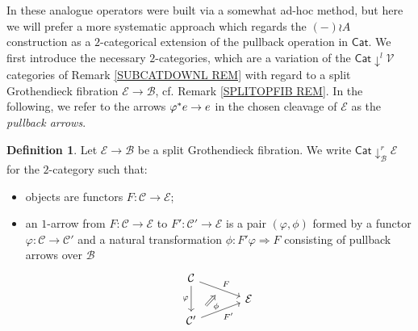 \documentclass[a4paper,10pt
,draft
]{article}%
\numberwithin{equation}{section}
\numberwithin{figure}{section}
\theoremstyle{definition} %
\newtheorem{definition}[equation]{Definition}%
\newcommand{\Cat}{\mathsf{Cat}}
\newcommand{\V}{\ensuremath{\mathcal V}}
\newcommand{\1}{\ensuremath{\mathbbm 1}}%
\begin{document}
In \cite{BP_geo} these analogue operators were built via a somewhat ad-hoc method, but here we will prefer a more systematic approach which regards the $(-) \wr A$ construction as a $2$-categorical extension of the pullback operation in $\Cat$.
We first introduce the necessary $2$-categories,
which are a variation of the 
$\mathsf{Cat}\downarrow^l \V$
categories of Remark \ref{SUBCATDOWNL REM} with regard to 
a split Grothendieck fibration $\mathcal{E} \to \mathcal{B}$,
cf. Remark \ref{SPLITOPFIB REM}.
In the following, we refer to the arrows 
$\varphi^{\**}e \to e$ in
the chosen cleavage of $\mathcal{E}$ as the \emph{pullback arrows}.





\begin{definition}
Let $\mathcal{E} \to \mathcal{B}$ be a split Grothendieck fibration.
We write $\mathsf{Cat}\downarrow^r_{\mathcal{B}} \mathcal{E}$ for the $2$-category such that:
\begin{itemize}
	\item objects are functors $F \colon \mathcal{C} \to \mathcal{E}$; 
	
	\item an $1$-arrow from 
	$F \colon \mathcal{C} \to \mathcal{E}$
	to
	$F' \colon \mathcal{C}' \to \mathcal{E}$
	is a pair $(\varphi,\phi)$
	formed by a functor $\varphi\colon \mathcal{C} \to \mathcal{C}'$ and a natural transformation $\phi \colon F' \varphi \Rightarrow F$ consisting of pullback arrows over $\mathcal{B}$
		\begin{equation}
		\begin{tikzcd}[row sep = tiny, column sep = 35pt]
			\mathcal{C} \arrow{dr}[name=U]{F} \arrow{dd}[swap]{\varphi}
		\\
			& \mathcal{E}
		\\
			|[alias=V]| \mathcal{C}' \arrow{ur}[swap]{F'}
		\arrow[Rightarrow, from=V, to=U,shorten >=0.25cm,shorten <=0.25cm
		,swap,"\phi"
		]
		\end{tikzcd}
		\end{equation}


\end{itemize}
\end{definition}
\end{document}
